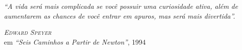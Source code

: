 
\begin{epigrafe} %

\hypertarget{estilo:epigrafe}{} %
 
\textit{\large``A vida será mais complicada se você possuir uma curiosidade ativa, além de aumentarem as chances de você entrar em apuros, mas será mais divertida''.}

\vspace{1cm}

\hspace{4cm} \emph{\textsc{Edward Speyer}}\\\hspace{4cm} em \textsl{``Seis Caminhos a Partir de Newton''}, 1994

\end{epigrafe}

